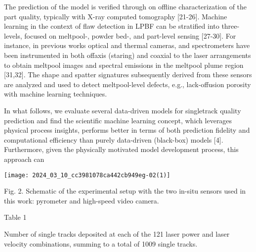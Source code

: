 \documentclass[10pt]{article}
\begin{document}
The prediction of the model is verified through on offline characterization of the part quality, typically with X-ray computed tomography [21-26]. Machine learning in the context of flaw detection in LPBF can be stratified into three-levels, focused on meltpool-, powder bed-, and part-level sensing [27-30]. For instance, in previous works optical and thermal cameras, and spectrometers have been instrumented in both offaxis (staring) and coaxial to the laser arrangements to obtain meltpool images and spectral emissions in the meltpool plume region [31,32]. The shape and spatter signatures subsequently derived from these sensors are analyzed and used to detect meltpool-level defects, e.g., lack-offusion porosity with machine learning techniques.

In what follows, we evaluate several data-driven models for singletrack quality prediction and find the scientific machine learning concept, which leverages physical process insights, performs better in terms of both prediction fidelity and computational efficiency than purely data-driven (black-box) models [4]. Furthermore, given the physically motivated model development process, this approach can

\begin{center}
\texttt{[image: 2024\_03\_10\_cc3981078ca442cb949eg-02(1)]}
\end{center}

Fig. 2. Schematic of the experimental setup with the two in-situ sensors used in this work: pyrometer and high-speed video camera.

Table 1

Number of single tracks deposited at each of the 121 laser power and laser velocity combinations, summing to a total of 1009 single tracks.
\end{document}
